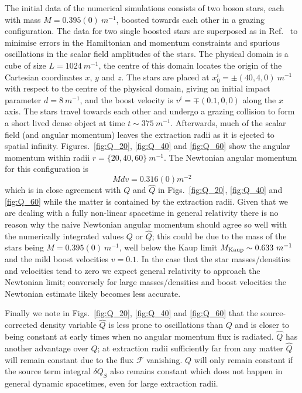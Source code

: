 The initial data of the numerical simulations consists of two boson stars, each with mass $M=0.395(0)~m^{-1}$, boosted towards each other in a grazing configuration. The data for two single boosted stars are superposed as in Ref.~\cite{helfer2021malaise} to minimise errors in the Hamiltonian and momentum constraints and spurious oscillations in the scalar field amplitudes of the stars. 
The physical domain is a cube of size $L=1024 ~m^{-1}$, the centre of this domain locates the origin of the Cartesian coordinates $x$, $y$ and $z$. The stars are placed at $x_0^i=\pm(40,4,0)~m^{-1}$ with respect to the centre of the physical domain, giving an initial impact parameter $d=8~m^{-1}$, and the boost velocity is $v^i=\mp(0.1,0,0)$ along the $x$ axis. The stars travel towards each other and undergo a grazing collision to form a short lived dense object at time $t \sim 375 ~m^{-1}$. Afterwards, much of the scalar field (and angular momentum) leaves the extraction radii as it is ejected to spatial infinity. Figures.~\ref{fig:Q_20}, \ref{fig:Q_40} and \ref{fig:Q_60} show the angular momentum within radii $r = \{20,40,60\}~m^{-1}$. The Newtonian angular momentum for this configuration is 
\begin{equation}\label{eq:newtQ}Mdv=0.316(0) m^{-2}\end{equation}
 which is in close agreement with $Q$ and $\hat{Q}$ in Figs.~\ref{fig:Q_20}, \ref{fig:Q_40} and \ref{fig:Q_60} while the matter is contained by the extraction radii. Given that we are dealing with a fully non-linear spacetime in general relativity there is no reason why the naive Newtonian angular momentum should agree so well with the numerically integrated values $Q$ or $\hat{Q}$; this could be due to the mass of the stars being $M=0.395(0) ~m^{-1}$, well below the Kaup limit $M_{\rm{Kaup}} \sim 0.633 ~m^{-1}$ and the mild boost velocities $v=0.1$. In the case that the star masses/densities and velocities tend to zero we expect general relativity to approach the Newtonian limit; conversely for large masses/densities and boost velocities the Newtonian estimate likely becomes less accurate. 

 Finally we note in Figs.~\ref{fig:Q_20}, \ref{fig:Q_40} and \ref{fig:Q_60} that the source-corrected density variable $\hat{Q}$ is less prone to oscillations than $Q$ and is closer to being constant at early times when no angular momentum flux is radiated. $\hat{Q}$ has another advantage over $Q$; at extraction radii sufficiently far from any matter $\hat{Q}$ will remain constant due to the flux $\mathcal{F}$ vanishing. $Q$ will only remain constant if the source term integral $\delta Q_S$ also remains constant which does not happen in general dynamic spacetimes, even for large extraction radii.






